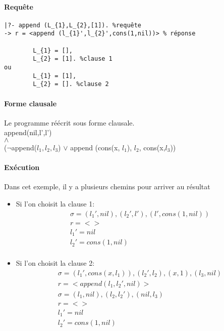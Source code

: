 \paragraph{Requête}
\begin{verbatim} 
|?- append (L_{1},L_{2},[1]). %requête
-> r = <append (l_{1}',l_{2}',cons(1,nil))> % réponse

		L_{1} = [],
		L_{2} = [1]. %clause 1
ou		
		L_{1} = [1],
		L_{2} = []. %clause 2
\end{verbatim}

\paragraph{Forme clausale}
Le programme réécrit sous forme clausale.\\
append(nil,l',l')\\
$\land$\\
($\neg$append($l_{1},l_{2},l_{3}$)
$\vee$ append (cons(x, $l_{1}$), $l_{2}$, cons(x,$l_{3}$))

\paragraph{Exécution}
Dans cet exemple, il y a plusieurs chemins pour arriver au résultat
\begin{itemize}
\item[] Si l'on choisit la clause 1: 
\begin{align*}
&\sigma = {(l_{1}',nil), (l_{2}',l'), (l',cons(1,nil))} \\
&r= < > \\
& l_{1}'=nil \\
& l_{2}'=cons(1,nil) \\
\end{align*}

\item[] Si l'on choisit la clause 2: 
\begin{align*}
&\sigma = {(l_{1}',cons(x,l_{1})), (l_{2}',l_{2}), (x,1), (l_{3},nil)} \\
&r= < append(l_{1},l_{2}',nil) > \\
&\sigma = {(l_{1},nil), (l_{2},l_{2}'), (nil,l_{3})} \\
&r= < > \\
& l_{1}'=nil \\
& l_{2}'=cons(1,nil) \\
\end{align*}

\end{itemize}


